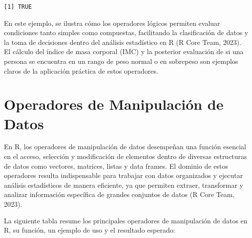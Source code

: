 \documentclass[
  spanish,
  a4paper,
  DIV=11,
  numbers=noendperiod,
  onepage,
  openany]{scrreprt}
\begin{document}
\begin{verbatim}
[1] TRUE
\end{verbatim}

En este ejemplo, se ilustra cómo los operadores lógicos permiten evaluar
condiciones tanto simples como compuestas, facilitando la clasificación
de datos y la toma de decisiones dentro del análisis estadístico en R (R
Core Team, 2023). El cálculo del índice de masa corporal (IMC) y la
posterior evaluación de si una persona se encuentra en un rango de peso
normal o en sobrepeso son ejemplos claros de la aplicación práctica de
estos operadores.

\section{Operadores de Manipulación de
Datos}\label{operadores-de-manipulaciuxf3n-de-datos}

En R, los operadores de manipulación de datos desempeñan una función
esencial en el acceso, selección y modificación de elementos dentro de
diversas estructuras de datos como vectores, matrices, listas y data
frames. El dominio de estos operadores resulta indispensable para
trabajar con datos organizados y ejecutar análisis estadísticos de
manera eficiente, ya que permiten extraer, transformar y analizar
información específica de grandes conjuntos de datos (R Core Team,
2023).

La siguiente tabla resume los principales operadores de manipulación de
datos en R, su función, un ejemplo de uso y el resultado esperado:
\end{document}
